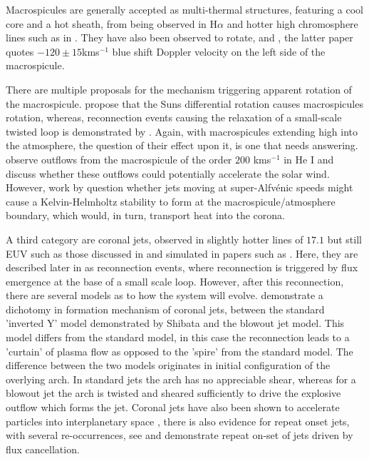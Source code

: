 \documentclass{emulateapj}
\begin{document}
Macrospicules are generally accepted as multi-thermal structures, featuring a cool core and a hot sheath, from being observed in H$\alpha$ \citep{LaBonte79} and hotter high chromosphere lines such as in \cite{Parenti2002}.
They have also been observed to rotate, \cite{Pike_Mason1998} and \cite{Kamio2010}, the latter paper quotes $-120 \pm 15$kms$^{-1}$ blue shift Doppler velocity on the left side of the macrospicule. 

There are multiple proposals for the mechanism triggering apparent rotation of the macrospicule. 
\cite{Curdt2011} propose that the Suns differential rotation causes macrospicules rotation, whereas, reconnection events causing the relaxation of a small-scale twisted loop is demonstrated by \cite{Adams2014}.
Again, with macrospicules extending high into the atmosphere, the question of their effect upon it, is one that needs answering.
\cite{Pike_Harrison1997} observe outflows from the macrospicule of the order $200$ kms$^{-1}$ in He I and discuss whether these outflows could potentially accelerate the solar wind.
However, work by \cite{Zaqarashvili2014} question whether jets moving at super-Alfv{\'e}nic speeds might cause a Kelvin-Helmholtz stability to form at the macrospicule/atmosphere boundary, which would, in turn, transport heat into the corona.

A third  category are coronal jets, observed in slightly hotter lines of $17.1$ but still EUV such as those discussed in \cite{Shibata1992} and simulated in papers such as \cite{Wyper2016}.
Here, they are described later in \cite{Shibata1994} as reconnection events, where reconnection is triggered by flux emergence at the base of a small scale loop.
However, after this reconnection, there are several models as to how the system will evolve.
\cite{Moore2010} demonstrate a dichotomy in formation mechanism of coronal jets, between the standard 'inverted Y' model demonstrated by Shibata and the blowout jet model. 
This model differs from the standard model, in this case the reconnection leads to a 'curtain' of plasma flow as opposed to the 'spire' from the standard model.
The difference between the two models originates in initial configuration of the overlying arch. 
In standard jets the arch has no appreciable shear, whereas for a blowout jet the arch is twisted and sheared sufficiently to drive the explosive outflow which forms the jet.
Coronal jets have also been shown to accelerate particles into interplanetary space \citep{Li2011}, there is also evidence for repeat onset jets, with several re-occurrences, see \cite{Li2011} and \cite{Chifor2008} demonstrate repeat on-set of jets driven by flux cancellation.
\end{document}
